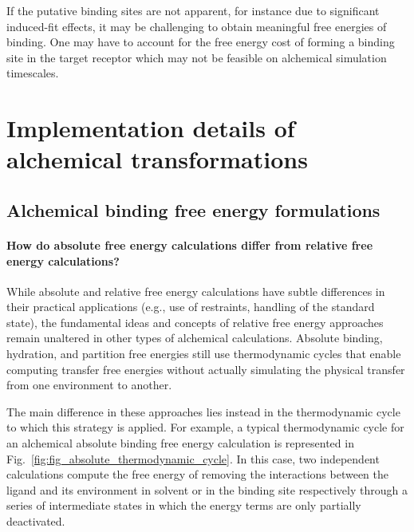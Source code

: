 \documentclass[9pt,bestpractices]{livecoms}
\begin{document}
If the putative binding sites are not apparent, for instance due to significant induced-fit effects, it may be challenging to obtain meaningful free energies of binding. One may have to account for the free energy cost of forming a binding site in the target receptor which may not be feasible on alchemical simulation timescales.

\section{Implementation details of alchemical transformations}
\label{sec:simulation_protocol_choice}

\subsection{Alchemical binding free energy formulations}
\label{subsec:formulations-abfe-rbfe}

\paragraph{How do absolute free energy calculations differ from relative free energy calculations?}

While absolute and relative free energy calculations have subtle differences in their practical applications (e.g., use of restraints, handling of the standard state), the fundamental ideas and concepts of relative free energy approaches remain unaltered in other types of alchemical calculations.
Absolute binding, hydration, and partition free energies still use thermodynamic cycles that enable computing transfer free energies without actually simulating the physical transfer from one environment to another.

The main difference in these approaches lies instead in the thermodynamic cycle to which this strategy is applied.
For example, a typical thermodynamic cycle for an alchemical absolute binding free energy calculation is represented in Fig.~\ref{fig:fig_absolute_thermodynamic_cycle}.
In this case, two independent calculations compute the free energy of removing the interactions between the ligand and its environment in solvent or in the binding site respectively through a series of intermediate states in which the energy terms are only partially deactivated.
\end{document}
